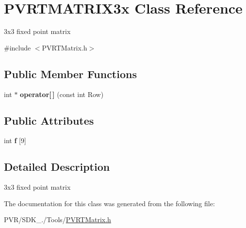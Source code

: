 \hypertarget{class_p_v_r_t_m_a_t_r_i_x3x}{\section{P\+V\+R\+T\+M\+A\+T\+R\+I\+X3x Class Reference}
\label{class_p_v_r_t_m_a_t_r_i_x3x}
}


3x3 fixed point matrix  




{\ttfamily \#include $<$P\+V\+R\+T\+Matrix.\+h$>$}

\subsection*{Public Member Functions}
\begin{DoxyCompactItemize}
\item 
\hypertarget{class_p_v_r_t_m_a_t_r_i_x3x_ad9ce6d422f73453d40dbf0a5a4e02139}{int $\ast$ {\bfseries operator\mbox{[}$\,$\mbox{]}} (const int Row)}\label{class_p_v_r_t_m_a_t_r_i_x3x_ad9ce6d422f73453d40dbf0a5a4e02139}

\end{DoxyCompactItemize}
\subsection*{Public Attributes}
\begin{DoxyCompactItemize}
\item 
\hypertarget{class_p_v_r_t_m_a_t_r_i_x3x_a3bf8a60f129bd1c00ffb77ba5cc8d213}{int {\bfseries f} \mbox{[}9\mbox{]}}\label{class_p_v_r_t_m_a_t_r_i_x3x_a3bf8a60f129bd1c00ffb77ba5cc8d213}

\end{DoxyCompactItemize}


\subsection{Detailed Description}
3x3 fixed point matrix 



 

The documentation for this class was generated from the following file\+:\begin{DoxyCompactItemize}
\item 
P\+V\+R/\+S\+D\+K\+\_./\+Tools/\hyperlink{_p_v_r_t_matrix_8h}{P\+V\+R\+T\+Matrix.\+h}\end{DoxyCompactItemize}
